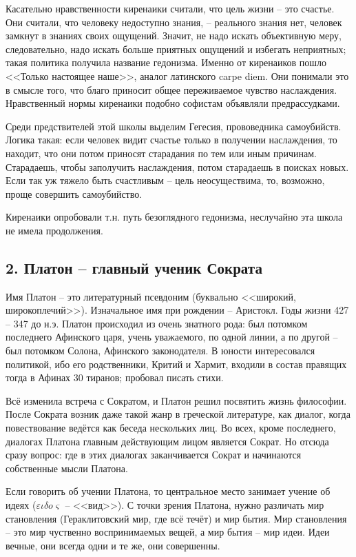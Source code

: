 \documentclass[a4paper, 12pt]{book} %
\begin{document}
Касательно нравственности киренаики считали, что цель жизни -- это счастье. Они считали, что человеку недоступно знания, -- реального знания нет, человек замкнут в знаниях своих ощущений. Значит, не надо искать объективную меру, следовательно, надо искать больше приятных ощущений и избегать неприятных; такая политика получила название гедонизма. Именно от киренаиков пошло <<Только настоящее наше>>, аналог латинского carpe diem. Они понимали это в смысле того, что благо приносит общее переживаемое чувство наслаждения. Нравственный нормы киренаики подобно софистам объявляли предрассудками.

Среди предствителей этой школы выделим Гегесия, прововедника самоубийств. Логика такая: если человек видит счастье только в получении наслаждения, то находит, что они потом приносят старадания по тем или иным причинам. Старадаешь, чтобы заполучить наслаждения, потом старадаешь в поисках новых. Если так уж тяжело быть счастливым -- цель неосуществима, то, возможно, проще совершить самоубийство.

Киренаики опробовали т.н. путь безоглядного гедонизма, неслучайно эта школа не имела продолжения.

\subsection*{2. Платон -- главный ученик Сократа}

Имя Платон -- это литературный псевдоним (буквально <<широкий, широкоплечий>>). Изначальное имя при рождении -- Аристокл. Годы жизни 427 -- 347 до н.э. Платон происходил из очень знатного рода: был потомком последнего Афинского царя, учень уважаемого, по одной линии, а по другой -- был потомком Солона, Афинского законодателя. В юности интересовался политикой, ибо его родственники, Критий и Хармит, входили в состав правящих тогда в Афинах 30 тиранов; пробовал писать стихи.

Всё изменила встреча с Сократом, и Платон решил посвятить жизнь философии. После Сократа возник даже такой жанр в греческой литературе, как диалог, когда повествование ведётся как беседа нескольких лиц. Во всех, кроме последнего, диалогах Платона главным действующим лицом является Сократ. Но отсюда сразу вопрос: где в этих диалогах заканчивается Сократ и начинаются собственные мысли Платона. 

Если говорить об учении Платона, то центральное место занимает учение об идеях ($\varepsilon \iota \delta o \varsigma$  -- <<вид>>). С точки зрения Платона, нужно различать мир становления (Гераклитовский мир, где всё течёт) и мир бытия. Мир становления -- это мир чуственно воспринимаемых вещей, а мир бытия -- мир идеи. Идеи вечные, они всегда одни и те же, они совершенны. 
\end{document}

